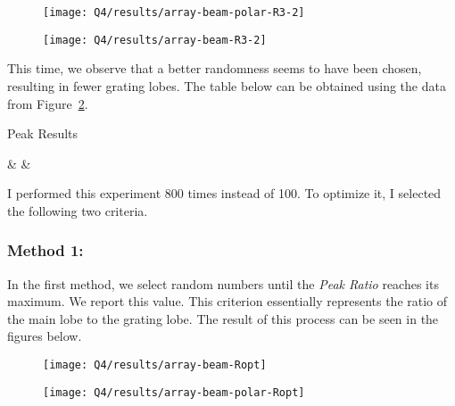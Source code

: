 \documentclass[12pt,onecolumn,a4paper]{article}
\begin{document}
	\begin{figure}[h]
		\centering
		\texttt{[image: Q4/results/array-beam-polar-R3-2]}
		\caption{}
		\label{fig:array-beam-polar-r3-2}
	\end{figure}
	
	\begin{figure}[h]
		\centering
		\texttt{[image: Q4/results/array-beam-R3-2]}
		\caption{}
		\label{fig:array-beam-r3-2}
	\end{figure}
	
		This time, we observe that a better randomness seems to have been chosen, resulting in fewer grating lobes. The table below can be obtained using the data from Figure~\ref{fig:array-beam-r3-2}.
		
	\begin{table}[h]
		\centering
		\caption{Peak Results}
		{%
			\csvcoli & \csvcolii & \csvcoliii
		}
	\end{table}
	
	
	I performed this experiment 800 times instead of 100. To optimize it, I selected the following two criteria.
	
	
	\subsubsection{Method 1:}
	
	In the first method, we select random numbers until the \textit{Peak Ratio} reaches its maximum. We report this value. This criterion essentially represents the ratio of the main lobe to the grating lobe.
	The result of this process can be seen in the figures below.
	
	
	
	\begin{figure}[H]
		\centering
		\texttt{[image: Q4/results/array-beam-Ropt]}
		\caption{}
		\label{fig:array-beam-ropt}
	\end{figure}
	\begin{figure}[H]
		\centering
		\texttt{[image: Q4/results/array-beam-polar-Ropt]}
		\caption{}
		\label{fig:array-beam-polar-ropt}
	\end{figure}
	
\end{document}
